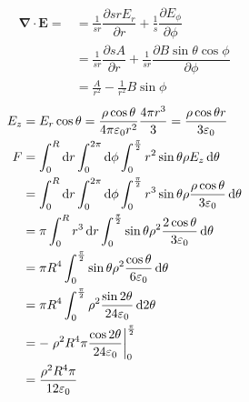 \begin{align*}
    \boldsymbol{\nabla}\cdot\boldsymbol{E}=
    &=\frac{1}{sr}\dfrac{\partial srE_r}{\partial r}
    +\frac{1}{s}\dfrac{\partial E_{\phi}}{\partial \phi}\\
    &=\frac{1}{sr}\dfrac{\partial sA}{\partial r}
    +\frac{1}{sr}\dfrac{\partial B\sin\theta\cos\phi}{\partial \phi}\\
    &=\frac{A}{r^2}-\frac{1}{r^2}{B\sin\phi}
\end{align*}
\begin{align*}
    E_z&=E_r\cos\theta
    =\frac{\rho\cos\theta}{4\pi\varepsilon_0r^2}\frac{4\pi r^3}{3}
    =\frac{\rho\cos\theta r}{3\varepsilon_0}\\
    F&=\int_{0}^{R}\dif r\int_{0}^{2\pi}\dif \phi\int_{0}^{\frac{\pi}{2}}r^2\sin\theta \rho E_z\dif\theta\\
    &=\int_{0}^{R}\dif r\int_{0}^{2\pi}\dif \phi\int_{0}^{\frac{\pi}{2}}r^3\sin\theta \rho\frac{\rho\cos\theta}{3\varepsilon_0}\dif\theta\\
    &=\pi\int_{0}^{R}r^3\dif r\int_{0}^{\frac{\pi}{2}}\sin\theta \rho^2\frac{2\cos\theta}{3\varepsilon_0}\dif\theta\\
    &=\pi R^4\int_{0}^{\frac{\pi}{2}}\sin\theta \rho^2\frac{\cos\theta}{6\varepsilon_0}\dif\theta\\
    &=\pi R^4\int_{0}^{\frac{\pi}{2}}\rho^2\frac{\sin2\theta}{24\varepsilon_0}\dif2\theta\\
    &=-\left.\rho^2R^4\pi\frac{\cos2\theta}{24\varepsilon_0}\right|_{0}^{\frac{\pi}{2}}\\
    &=\frac{\rho^2R^4\pi}{12\varepsilon_0}
\end{align*}
